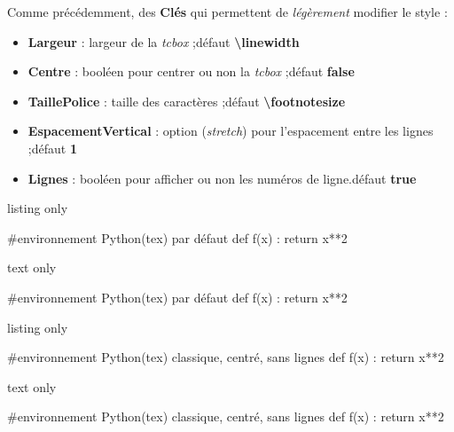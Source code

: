 \documentclass[a4paper,french,11pt]{article}
\newcommand\Cle[1]{{\bfseries\sffamily\textlangle \textcolor{orange!75!black}{#1}\textrangle}}
\begin{document}
\begin{cautionblock}
Comme précédemment, des \Cle{Clés} qui permettent de \textit{légèrement} modifier le style :

\begin{itemize}
	\item \Cle{Largeur} : largeur de la \textit{tcbox} ;\hfill{}défaut \Cle{\textbackslash linewidth}
	\item \Cle{Centre} : booléen pour centrer ou non la \textit{tcbox} ;\hfill{}défaut \Cle{false}
	\item \Cle{TaillePolice} : taille des caractères ;\hfill{}défaut \Cle{\textbackslash footnotesize}
	\item \Cle{EspacementVertical} : option (\textit{stretch}) pour l'espacement entre les lignes ;\hfill{}défaut \Cle{1}
	\item \Cle{Lignes} : booléen pour afficher ou non les numéros de ligne.\hfill{}défaut \Cle{true}
\end{itemize}
\vspace*{-\baselineskip}\leavevmode
\end{cautionblock}

\begin{PresCodeTexPL}{listing only}
\begin{CodePythontex}{} %
	#environnement Python(tex) par défaut
	def f(x) :
		return x**2
\end{CodePythontex}
\end{PresCodeTexPL}

\begin{PresCodeSortiePL}{text only}
\begin{CodePythontex}{}
	#environnement Python(tex) par défaut
	def f(x) :
		return x**2
\end{CodePythontex}
\end{PresCodeSortiePL}

\begin{PresCodeTexPL}{listing only}
\begin{CodePythontexAlt}[Largeur=12cm,Centre,Lignes=false]{}
	#environnement Python(tex) classique, centré, sans lignes
	def f(x) :
		return x**2
\end{CodePythontexAlt}
\end{PresCodeTexPL}

\begin{PresCodeSortiePL}{text only}
\begin{CodePythontexAlt}[Largeur=12cm,Centre,Lignes=false]{}
	#environnement Python(tex) classique, centré, sans lignes
	def f(x) :
		return x**2
\end{CodePythontexAlt}
\end{PresCodeSortiePL}
\end{document}
